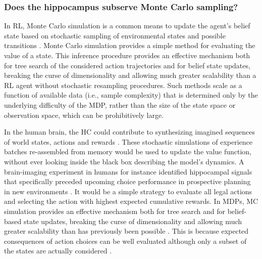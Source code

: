 \documentclass[10pt,letterpaper]{article}
\begin{document}
\subsubsection{Does the hippocampus subserve Monte Carlo sampling?}
In RL, Monte Carlo simulation is a common means to update the agent's belief state
based on stochastic sampling of environmental states and
possible transitions \citep{daw2014algorithmic,silver2010monte}.
Monte Carlo simulation provides a simple method for evaluating the value of a state.
This inference procedure provides an effective mechanism both for tree search of the considered
action trajectories
and for belief state updates, breaking the curse of dimensionality and allowing much greater scalability than a RL agent without stochastic resampling procedures.
Such methods scale as a function of available data (i.e., sample complexity) that
is determined only by the underlying difficulty of the MDP, rather than the size of the state space or observation space,
which can be prohibitively large.

In the human brain,
the HC could contribute to synthesizing imagined sequences of world states,
actions and rewards \citep{aronov2017, chao2017interaction, boyer2008evolutionary}.
These stochastic simulations of experience batches re-assembled from memory
would be used to update the value function, without ever looking inside the black box describing the model's dynamics.
A brain-imaging experiment in humans for instance identified hippocampal signals that specifically preceded upcoming choice performance in prospective planning in new environments
\citep{kaplan2017neural}.
It would be a simple strategy to evaluate
all legal actions and selecting the action with
highest expected cumulative rewards.
In MDPs, MC simulation provides an effective mechanism both for tree search and for belief-based state updates, breaking the curse of dimensionality and allowing much greater scalability than has previously been possible \citep{silver2016mastering}.
This is because expected consequences of action choices can be well evaluated although only a subset of the states are actually considered \citep{daw2014algorithmic}.
\end{document}
